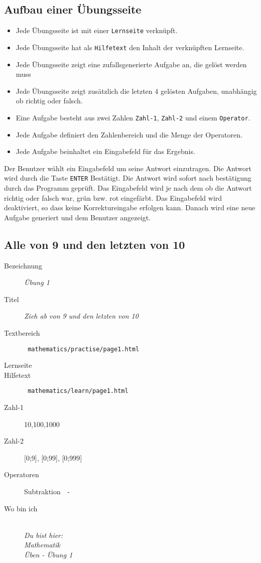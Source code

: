 \subsection{ Aufbau einer Übungsseite }
\label{cha:math-practise-structure}
\begin{itemize}
  \item Jede Übungsseite ist mit einer \texttt{Lernseite} verknüpft.
  \item Jede Übungsseite hat als \texttt{Hilfetext} den Inhalt der verknüpften Lernseite.
  \item Jede Übungsseite zeigt eine zufallsgenerierte Aufgabe an, die gelöst werden muss
  \item Jede Übungsseite zeigt zusätzlich die letzten 4 gelösten Aufgaben, unabhängig ob richtig oder falsch.
  \item Eine Aufgabe besteht aus zwei Zahlen \texttt{Zahl-1}, \texttt{Zahl-2} und einem \texttt{Operator}.
  \item Jede Aufgabe definiert den Zahlenbereich und die Menge der Operatoren.
  \item Jede Aufgabe beinhaltet ein Eingabefeld für das Ergebnis.
\end{itemize}

Der Benutzer wählt ein Eingabefeld um seine Antwort einzutragen. Die Antwort wird durch die Taste \texttt{ENTER} Bestätigt. Die Antwort wird sofort nach bestätigung durch das Programm geprüft. Das Eingabefeld wird je nach dem ob die Antwort richtig oder falsch war, grün bzw. rot eingefärbt. Das Eingabefeld wird deaktiviert, so dass keine Korrektureingabe erfolgen kann. Danach wird eine neue Aufgabe generiert und dem Benutzer angezeigt.

\subsection{ Alle von 9 und den letzten von 10 }
\label{cha:math-practise-page1}
\begin{description}
  \item[Bezeichnung] \emph{ Übung 1 }
  \item[Titel] \emph{ Zieh ab von 9 und den letzten von 10 }
  \item[Textbereich] \texttt{ mathematics/practise/page1.html }
  \item[Lernseite] 
  \item[Hilfetext] \texttt{ mathematics/learn/page1.html }
  \item[Zahl-1] {10,100,1000}
  \item[Zahl-2] {[0;9], [0;99], [0;999]}
  \item[Operatoren] Subtraktion \texttt{ - }
  \item[Wo bin ich] \emph{\\Du bist hier:\\Mathematik\\Üben - Übung 1}
\end{description}



